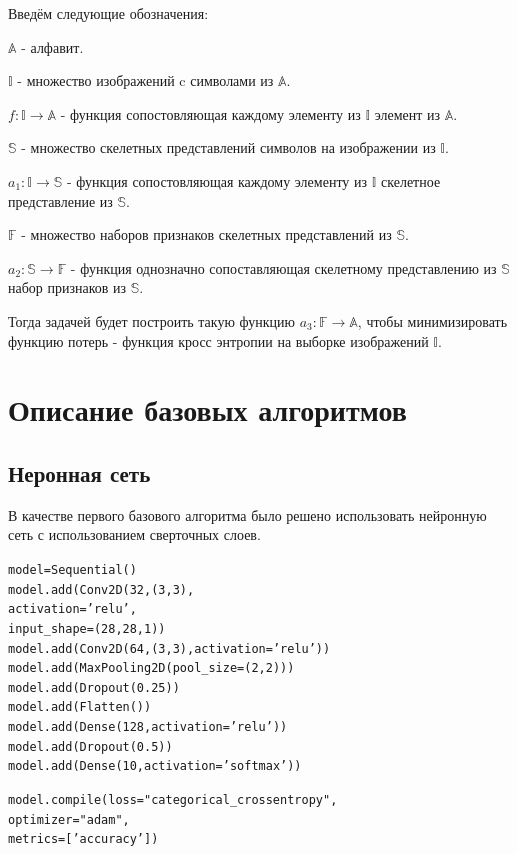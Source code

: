 \documentclass{llncs}
\begin{document}
Введём следующие обозначения:

\item $\mathbb{A}$ - алфавит.
\item $\mathbb{I}$ - множество изображений c символами из $\mathbb{A}$.
\item $f: \mathbb{I} \rightarrow \mathbb{A}$ - функция сопостовляющая каждому элементу из $\mathbb{I}$ элемент из $\mathbb{A}$.
\item $\mathbb{S}$ - множество скелетных представлений символов на изображении из $\mathbb{I}$.
\item $a_1: \mathbb{I} \rightarrow \mathbb{S}$ - функция сопостовляющая каждому элементу из $\mathbb{I}$ скелетное представление из $\mathbb{S}$.
\item $\mathbb{F}$ - множество наборов признаков скелетных представлений из $\mathbb{S}$.
\item $a_2: \mathbb{S} \rightarrow \mathbb{F}$ - функция однозначно сопоставляющая скелетному представлению из $\mathbb{S}$ набор признаков из $\mathbb{S}$. 

Тогда задачей будет построить такую функцию $a_3: \mathbb{F} \rightarrow \mathbb{A}$, чтобы минимизировать функцию потерь - функция кросс энтропии на выборке изображений $\mathbb{I}$.

\section{Описание базовых алгоритмов}
\subsection{Неронная сеть}
В качестве первого базового алгоритма было решено использовать нейронную сеть с использованием сверточных слоев. 
\begin{alltt}
model = Sequential()
model.add(Conv2D(32, (3, 3),
                 activation='relu',
                 input_shape=(28,28,1))
model.add(Conv2D(64, (3, 3), activation='relu'))
model.add(MaxPooling2D(pool_size=(2, 2)))
model.add(Dropout(0.25))
model.add(Flatten())
model.add(Dense(128, activation='relu'))
model.add(Dropout(0.5))
model.add(Dense(10, activation='softmax'))

model.compile(loss="categorical_crossentropy",
              optimizer="adam",
              metrics=['accuracy'])
\end{alltt}
\end{document}
